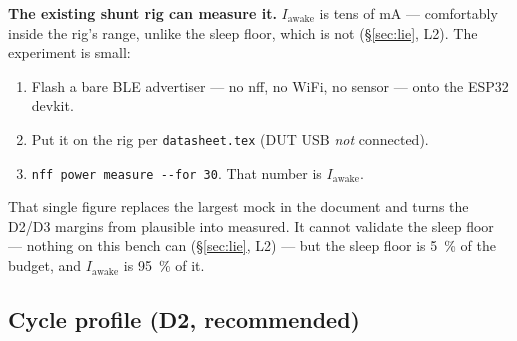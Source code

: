 \documentclass[11pt,a4paper]{article}
\begin{document}
\medskip
\noindent
\textbf{The existing shunt rig can measure it.} $I_\text{awake}$ is tens of
\si{\milli\ampere} --- comfortably inside the rig's range, unlike the sleep floor, which is not
(\S\ref{sec:lie}, L2). The experiment is small:

\begin{enumerate}[leftmargin=*,nosep]
  \item Flash a bare BLE advertiser --- no nff, no WiFi, no sensor --- onto the ESP32 devkit.
  \item Put it on the rig per \texttt{datasheet.tex} (DUT USB \emph{not} connected).
  \item \texttt{nff power measure -{}-for 30}. That number is $I_\text{awake}$.
\end{enumerate}

\medskip
\noindent
That single figure replaces the largest mock in the document and turns the D2/D3 margins from
plausible into measured. It cannot validate the sleep floor --- nothing on this bench can
(\S\ref{sec:lie}, L2) --- but the sleep floor is \SI{5}{\percent} of the budget, and
$I_\text{awake}$ is \SI{95}{\percent} of it.

\subsection{Cycle profile (D2, recommended)}
\end{document}
